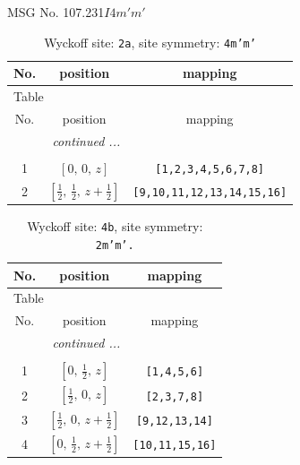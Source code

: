 \documentclass[fleqn,8pt]{jsarticle}
\begin{document}
\setcounter{MaxMatrixCols}{32}

\renewcommand{\tablename}{Table~}
\renewcommand{\figurename}{Figure~}
\begin{center}
\LARGE
MSG No. 107.231\quad$I4m'm'$
\end{center}
\renewcommand{\arraystretch}{1.2}
\begin{longtable}{ccc}
\caption{Wyckoff site: {\tt 2a}, site symmetry: {\tt 4m'm'}}
 \\
 \hline \hline
No. & position & mapping \\ \hline \endfirsthead

\multicolumn{2}{l}{\tablename\ \thetable{}} \\
 \hline \hline
No. & position & mapping \\ \hline \endhead

 \hline \hline
\multicolumn{2}{r}{\footnotesize\it continued ...} \\ \endfoot

 \hline \hline
\multicolumn{2}{r}{} \\ \endlastfoot

1 & $\left[ 0,\, 0,\, z \right]$ & {\tt [1,2,3,4,5,6,7,8]} \\ \hline
2 & $\left[ \frac{1}{2},\, \frac{1}{2},\, z + \frac{1}{2} \right]$ & {\tt [9,10,11,12,13,14,15,16]} \\
\end{longtable}
\renewcommand{\arraystretch}{1.2}
\begin{longtable}{ccc}
\caption{Wyckoff site: {\tt 4b}, site symmetry: {\tt 2m'm'.}}
 \\
 \hline \hline
No. & position & mapping \\ \hline \endfirsthead

\multicolumn{2}{l}{\tablename\ \thetable{}} \\
 \hline \hline
No. & position & mapping \\ \hline \endhead

 \hline \hline
\multicolumn{2}{r}{\footnotesize\it continued ...} \\ \endfoot

 \hline \hline
\multicolumn{2}{r}{} \\ \endlastfoot

1 & $\left[ 0,\, \frac{1}{2},\, z \right]$ & {\tt [1,4,5,6]} \\ \hline
2 & $\left[ \frac{1}{2},\, 0,\, z \right]$ & {\tt [2,3,7,8]} \\ \hline
3 & $\left[ \frac{1}{2},\, 0,\, z + \frac{1}{2} \right]$ & {\tt [9,12,13,14]} \\ \hline
4 & $\left[ 0,\, \frac{1}{2},\, z + \frac{1}{2} \right]$ & {\tt [10,11,15,16]} \\
\end{longtable}
\end{document}
